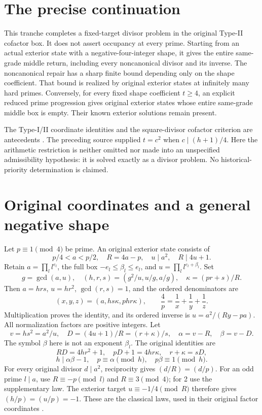 \section{The precise continuation}
This tranche completes a fixed-target divisor problem in the original Type-II
cofactor box. It does not assert occupancy at every prime. Starting from an
actual exterior state with a negative-four-integer shape, it gives the entire
same-grade middle return, including every noncanonical divisor and its inverse.
The noncanonical repair has a sharp finite bound depending only on the shape
coefficient. That bound is realized by original exterior states at infinitely
many hard primes. Conversely, for every fixed shape coefficient $t\ge4$, an
explicit reduced prime progression gives original exterior states whose entire
same-grade middle box is empty. Their known exterior solutions remain present.

The Type-I/II coordinate identities and the square-divisor cofactor criterion
are antecedents \cite[\S2, Propositions 2.2 and 2.6]{ET}. The preceding source
\cite[negative-four-square transfer]{Turn7Fabel} supplied $t=c^2$ when
$c\mid(h+1)/4$. Here the arithmetic restriction is neither omitted nor made into
an unspecified admissibility hypothesis: it is solved exactly as a divisor
problem. No historical-priority determination is claimed.

\section{Original coordinates and a general negative shape}
Let $p\equiv1\pmod4$ be prime. An original exterior state consists of
\[
 p/4<a<p/2,\quad R=4a-p,\quad u\mid a^2,\quad R\mid4u+1.
\]
Retain $a=\prod_l l^{e_l}$, the full box $-e_l\le\beta_l\le e_l$, and
$u=\prod_l l^{e_l+\beta_l}$. Set
\[
 g=\gcd(a,u),\quad (h,r,s)=(g^2/u,u/g,a/g),\quad
 \kappa=(pr+s)/R.
\]
Then $a=hrs$, $u=hr^2$, $\gcd(r,s)=1$, and the ordered denominators are
\[
 (x,y,z)=(a,hs\kappa,phr\kappa),\qquad
 \frac4p=\frac1x+\frac1y+\frac1z.                         \tag{1}
\]
Multiplication proves the identity, and its ordered inverse is
$u=a^2/(Ry-pa)$. All normalization factors are positive integers. Let
\[
 v=hs^2=a^2/u,\quad D=(4u+1)/R=(r+\kappa)/s,
 \quad \alpha=v-R,\quad\beta=v-D.
\]
The symbol $\beta$ here is not an exponent $\beta_l$. The original identities are
\[
 RD=4hr^2+1,\quad pD+1=4hr\kappa,\quad r+\kappa=sD,
\]
\[
 h\mid\alpha\beta-1,\quad p\equiv\alpha\pmod h,
 \quad p\beta\equiv1\pmod h.                             \tag{2}
\]
For every original divisor $d\mid a^2$, reciprocity gives $(d/R)=(d/p)$.
For an odd prime $l\mid a$, use $R\equiv-p\pmod l$ and $R\equiv3\pmod4$;
for 2 use the supplementary law. The exterior target $u\equiv-1/4\pmod R$
therefore gives $(h/p)=(u/p)=-1$. These are the classical laws, used in their
original factor coordinates \cite[\S6.4]{Hatcher}.

